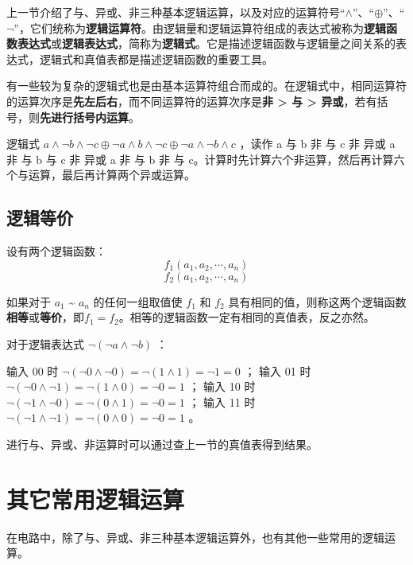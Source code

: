 上一节介绍了与、异或、非三种基本逻辑运算，以及对应的运算符号“$\land$”、“$\oplus$”、“$\lnot$”，它们统称为\textbf{逻辑运算符}。由逻辑量和逻辑运算符组成的表达式被称为\textbf{逻辑函数表达式}或\textbf{逻辑表达式}，简称为\textbf{逻辑式}。它是描述逻辑函数与逻辑量之间关系的表达式，逻辑式和真值表都是描述逻辑函数的重要工具。

有一些较为复杂的逻辑式也是由基本运算符组合而成的。在逻辑式中，相同运算符的运算次序是\textbf{先左后右}，而不同运算符的运算次序是\textbf{非 > 与 > 异或}，若有括号，则\textbf{先进行括号内运算}。

\begin{example}{}{}
  逻辑式 $a \land \lnot b \land \lnot c \oplus \lnot a \land b \land \lnot c \oplus \lnot a \land \lnot b \land c$ ，读作 a 与 b 非 与 c 非 异或 a 非 与 b 与 c 非 异或 a 非 与 b 非 与 c。计算时先计算六个非运算，然后再计算六个与运算，最后再计算两个异或运算。
\end{example}

\subsection{逻辑等价}

设有两个逻辑函数：
$$f_1(a_1, a_2, \cdots, a_n)$$
$$f_2(a_1, a_2, \cdots, a_n)$$

如果对于 $a_1$ \textasciitilde{} $a_n$ 的任何一组取值使 $f_1$ 和 $f_2$ 具有相同的值，则称这两个逻辑函数\textbf{相等}或\textbf{等价}，即$f_1 = f_2$。相等的逻辑函数一定有相同的真值表，反之亦然。

\begin{example}{}{}
  对于逻辑表达式 $\lnot (\lnot a \land \lnot b)$ ：

  输入 00 时 $\lnot (\lnot 0 \land \lnot 0) = \lnot (1 \land 1) = \lnot 1 = 0$ ；
  输入 01 时 $\lnot (\lnot 0 \land \lnot 1) = \lnot (1 \land 0) = \lnot 0 = 1$ ；
  输入 10 时 $\lnot (\lnot 1 \land \lnot 0) = \lnot (0 \land 1) = \lnot 0 = 1$ ；
  输入 11 时 $\lnot (\lnot 1 \land \lnot 1) = \lnot (0 \land 0) = \lnot 0 = 1$ 。

  进行与、异或、非运算时可以通过查上一节的真值表得到结果。
\end{example}

\section{其它常用逻辑运算}

在电路中，除了与、异或、非三种基本逻辑运算外，也有其他一些常用的逻辑运算。

